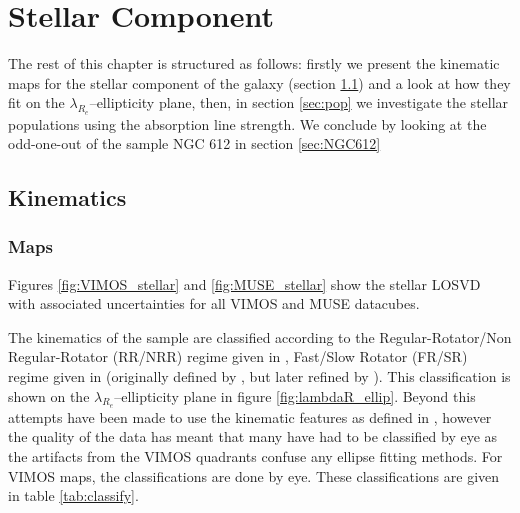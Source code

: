 \chapter{Stellar Component}
	\label{cha:stellar}


The rest of this chapter is structured as follows: firstly we present the kinematic maps for the stellar component of the galaxy (section \ref{sec:stellarKin}) and a look at how they fit on the $\lambda_{R_e}$--ellipticity plane, then, in section \ref{sec:pop} we investigate the stellar populations using the absorption line strength. We conclude by looking at the odd-one-out of the sample NGC 612 in section \ref{sec:NGC612}

\section{Kinematics}
	\label{sec:stellarKin}

	\subsection{Maps}
		\label{subsec:maps}


		Figures \ref{fig:VIMOS_stellar} and \ref{fig:MUSE_stellar} show the stellar LOSVD with associated uncertainties for all VIMOS and MUSE datacubes. 

		The kinematics of the sample are classified according to the Regular-Rotator/Non Regular-Rotator (RR/NRR) regime given in \citet{Krajnovic2011}, Fast/Slow Rotator (FR/SR) regime given in \citet{Cappellari2016} (originally defined by \citet{Emsellem2011}, but later refined by \citet{Cappellari2016}). This classification is shown on the $\lambda_{R_e}$--ellipticity plane in figure \ref{fig:lambdaR_ellip}. Beyond this attempts have been made to use the kinematic features as defined in \citet{Krajnovic2011}, however the quality of the data has meant that many have had to be classified by eye as the artifacts from the VIMOS quadrants confuse any ellipse fitting methods. For VIMOS maps, the classifications are done by eye. These classifications are given in table \ref{tab:classify}. 


